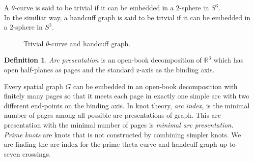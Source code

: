 \documentclass{article}
\theoremstyle{definition}
\newtheorem{defn}[thm]{Definition}
\theoremstyle{theorem}
\theoremstyle{proposition}
\theoremstyle{corollary}
\begin{document}
A $\theta$-curve is said to be trivial if it can be embedded in a $2$-sphere in $S^3$. \\
In the similiar way, a handcuff graph is said to be trivial if it can be embedded in a $2$-sphere in $S^3$.

\begin{figure}[h]
    \centering
    \hspace{0.05\linewidth}
    \caption{Trivial $\theta$-curve and handcuff graph.}
    \label{figure_1} 
\end{figure}

\begin{defn}
    \textit{Arc presentation} is an open-book decomposition of $\mathbb{R}^3$ which has open half-planes as pages and the standard z-axis as the binding axis.
\end{defn}

Every spatial graph $G$ can be embedded in an open-book decomposition with finitely many pages so that it meets each page in exactly one simple arc with two different end-points on the binding axis.
In knot theory, \textit{arc index}, is the minimal number of pages among all possible arc presentations of graph. This arc presentation with the minimal number of pages is \textit{minimal arc presentation.} \textit{Prime knots} are knots that is not constructed by combining simpler knots. We are finding the arc index for the prime theta-curve and handcuff graph up to seven crossings.
\end{document}
